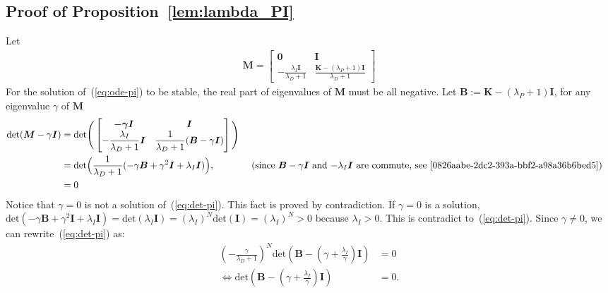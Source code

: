 \subsection{Proof of Proposition~\ref{lem:lambda_PI}}
\label{secapp:lambda_PI}
Let
\begin{align}
    \bm{M} = \begin{bmatrix} \bm{0} & \bm{I} \\ \displaystyle -\frac{\lambda_I\bm{I}}{\lambda_D + 1} &\displaystyle \frac{\bm{K} - (\lambda_P + 1)\bm{I}}{\lambda_D + 1} \end{bmatrix}
\end{align}
For the solution of~(\ref{eq:ode-pi}) to be stable, the real part of eigenvalues of $\bm{M}$ must be all negative. Let $\bm{B} := \bm{K} - (\lambda_P + 1)\bm{I}$, for any eigenvalue $\gamma$ of $\bm{M}$
\begin{equation}
\label{eq:det-pi}
\begin{aligned}
\mathrm{det}( \bm{M} - \gamma\bm{I}) &= \mathrm{det}\Bigg( \begin{bmatrix} \bm{-\gamma\bm{I}} & \bm{I} \\ -\displaystyle \frac{\lambda_I}{\lambda_D + 1}\bm{I} & \displaystyle\frac{1}{\lambda_D + 1}(\bm{B} - \gamma\bm{I}) \end{bmatrix}\Bigg) \\
&= \mathrm{det}\Big(\frac{1}{\lambda_D + 1}(-\gamma\bm{B} + \gamma^2\bm{I} + \lambda_I \bm{I})\Big), &&\ (\text{since $\bm{B} - \gamma\bm{I}$ and $-\lambda_I\bm{I}$ are commute, see~\cite{0826aabe-2dc2-393a-bbf2-a98a36b6bed5}}) \\
&= 0\\
\end{aligned}
\end{equation}
Notice that $\gamma = 0$ is not a solution of~(\ref{eq:det-pi}). This fact is proved by contradiction. If $\gamma = 0$ is a solution, $\mathrm{det}(-\gamma\bm{B} + \gamma^2\bm{I} + \lambda_I\bm{I}) = \mathrm{det}(\lambda_I\bm{I}) = (\lambda_I)^N\mathrm{det}(\bm{I}) = (\lambda_I)^N > 0$ because $\lambda_I > 0$. This is contradict to~(\ref{eq:det-pi}). Since $\gamma \neq 0$, we can rewrite~(\ref{eq:det-pi}) as:
\begin{align}
    (-\frac{\gamma}{\lambda_D + 1})^N\mathrm{det}(\bm{B} - (\gamma + \frac{\lambda_I}{\gamma})\bm{I}) &=  0\\
    \iff \mathrm{det}(\bm{B} - (\gamma + \frac{\lambda_I}{\gamma})\bm{I}) &=  0.
\end{align}
